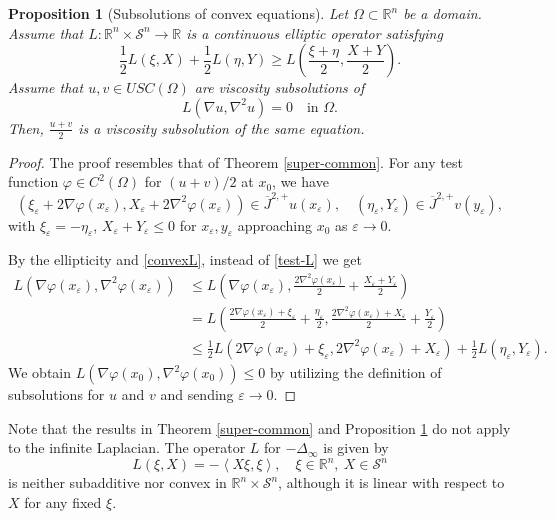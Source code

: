 \documentclass[12pt, reqno]{amsart}
\newtheorem{proposition}[theorem]{Proposition}
\newcommand{\R}{\mathbb{R}}
\newcommand{\Jop}{\overline{J}^{2,+}}
\def\vep{\varepsilon}
\def\R{{\mathbb R}}
\def\S{{\mathcal S}}
\begin{document}
\begin{proposition}[Subsolutions of convex equations]\label{prop-convex}
    Let $\Omega\subset \mathbb{R}^n$ be a domain.  Assume that $L:\R^n\times \S^n\to \R$ is a continuous elliptic operator satisfying 
    \begin{equation}\label{convexL}
\frac{1}{2}L(\xi, X)+\frac{1}{2}L(\eta, Y)\ge L\left(\frac{\xi+\eta}{2}, \frac{X+Y}{2}\right).
\end{equation}
Assume that $u, v\in USC(\Omega)$ are viscosity subsolutions of 
\[
L(\nabla u, \nabla^2 u)=0 \quad \text{in $\Omega$.}
\]
Then, $\displaystyle \frac{u+v}{2}$ is a viscosity subsolution of the same equation. 
\end{proposition}
\begin{proof}
The proof resembles that of Theorem \ref{super-common}.  For any test function $\varphi\in C^2(\Omega)$ for $(u+v)/2$ at $x_0$, we have 
\[
(\xi_\varepsilon+2\nabla \varphi(x_\varepsilon), X_\varepsilon+2\nabla^2 \varphi(x_\varepsilon))\in \Jop u(x_\varepsilon), \quad(\eta_\varepsilon, Y_\varepsilon)\in \Jop v(y_\varepsilon),
\]
with $\xi_\varepsilon=-\eta_\varepsilon$, $X_\varepsilon+Y_\varepsilon\le 0$ for $x_\vep, y_\vep$ approaching $x_0$ as $\vep\to 0$.

By the ellipticity and \eqref{convexL}, instead of \eqref{test-L} we get
\[
\begin{aligned}
L(\nabla \varphi(x_\varepsilon), \nabla^2\varphi(x_\varepsilon))&\le L\left(\nabla \varphi(x_\varepsilon), \frac{2\nabla^2\varphi(x_\varepsilon)}{2}+\frac{X_\varepsilon+Y_\varepsilon}{2}\right)\\
&=L\left(\frac{2\nabla \varphi(x_\varepsilon)+\xi_\varepsilon}{2}+\frac{\eta_\varepsilon}{2}, \frac{2\nabla^2\varphi(x_\varepsilon)+X_\varepsilon}{2}+\frac{Y_\varepsilon}{2}\right)\\
&\le \frac{1}{2}L\left(2\nabla \varphi(x_\varepsilon)+\xi_\varepsilon,{2\nabla^2\varphi(x_\varepsilon)}+X_\varepsilon\right)+\frac{1}{2}L(\eta_\varepsilon, Y_\varepsilon).
\end{aligned}
\]
We obtain $L(\nabla\varphi(x_0), \nabla^2 \varphi(x_0))\leq 0$ by utilizing the definition of subsolutions for $u$ and $v$ and sending $\vep\to 0$.
\end{proof}


Note that the results in Theorem \ref{super-common} and Proposition \ref{prop-convex} do not apply to the infinite Laplacian. The operator $L$ for $-\Delta_\infty$ is given by 
\[
L(\xi, X)=-\left\langle X \xi, \xi\right\rangle, \quad \xi\in \R^n, \ X\in \S^n
\]
is neither subadditive nor convex in $\R^n\times \S^n$, although it is linear with respect to $X$ for any fixed $\xi$. 
\end{document}
